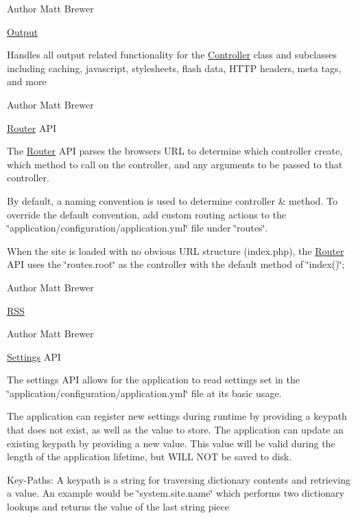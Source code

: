 \begin{DoxyAuthor}{Author}
Matt Brewer
\end{DoxyAuthor}
\hyperlink{class_output}{Output}

Handles all output related functionality for the \hyperlink{class_controller}{Controller} class and subclasses including caching, javascript, stylesheets, flash data, HTTP headers, meta tags, and more

\begin{DoxyAuthor}{Author}
Matt Brewer
\end{DoxyAuthor}
\hyperlink{class_router}{Router} API

The \hyperlink{class_router}{Router} API parses the browsers URL to determine which controller create, which method to call on the controller, and any arguments to be passed to that controller.

By default, a naming convention is used to determine controller \& method. To override the default convention, add custom routing actions to the \char`\"{}application/configuration/application.yml\char`\"{} file under \char`\"{}routes\char`\"{}.

When the site is loaded with no obvious URL structure (index.php), the \hyperlink{class_router}{Router} API uses the \char`\"{}routes.root\char`\"{} as the controller with the default method of \char`\"{}index()\char`\"{};

\begin{DoxyAuthor}{Author}
Matt Brewer
\end{DoxyAuthor}
\hyperlink{class_r_s_s}{RSS}

\begin{DoxyAuthor}{Author}
Matt Brewer
\end{DoxyAuthor}
\hyperlink{class_settings}{Settings} API

The settings API allows for the application to read settings set in the \char`\"{}application/configuration/application.yml\char`\"{} file at its basic usage.

The application can register new settings during runtime by providing a keypath that does not exist, as well as the value to store. The application can update an existing keypath by providing a new value. This value will be valid during the length of the application lifetime, but WILL NOT be saved to disk.

Key-\/Paths: A keypath is a string for traversing dictionary contents and retrieving a value. An example would be \char`\"{}system.site.name\char`\"{} which performs two dictionary lookups and returns the value of the last string piece


